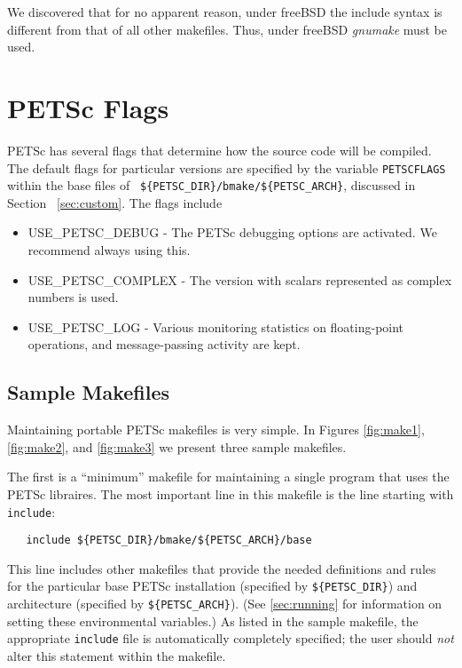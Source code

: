 We discovered that for no apparent reason, under freeBSD the include 
syntax is different from that of all other makefiles. Thus, under 
freeBSD {\em gnumake} must be used.

\section{PETSc Flags}
\label{sec:makeflags}

PETSc has several flags that determine how the source code will be
compiled.  The default flags for particular versions are specified by
the variable {\tt PETSCFLAGS} within the base files of {\tt
\$\{PETSC\_DIR\}/bmake/\$\{PETSC\_ARCH\}}, discussed in Section
~\ref{sec:custom}.  The flags include
\begin{itemize}
\item USE\_PETSC\_DEBUG - The PETSc debugging options are activated. We 
      recommend always using this. 
\item USE\_PETSC\_COMPLEX - The version with scalars represented 
      as complex numbers is used. 
\item USE\_PETSC\_LOG - Various monitoring statistics on floating-point operations,
      and message-passing activity are kept. 
\end{itemize}

\subsection{Sample Makefiles}

Maintaining portable PETSc makefiles is very simple. In Figures
\ref{fig:make1}, \ref{fig:make2}, and \ref{fig:make3} we present three
sample makefiles.  

The first is a ``minimum'' makefile for maintaining
a single program that uses the PETSc libraires.
The most important line in this makefile is the line starting with {\tt include}:
\begin{verbatim}
   include ${PETSC_DIR}/bmake/${PETSC_ARCH}/base
\end{verbatim}
This line includes other makefiles that provide the needed definitions
and rules for the particular base PETSc installation (specified by
{\tt \$\{PETSC\_DIR\}}) and architecture (specified by
{\tt \$\{PETSC\_ARCH\}}).  (See \ref{sec:running} for information on
setting these environmental variables.)  As listed in the sample
makefile, the appropriate {\tt include} file is automatically
completely specified; the user should {\em not} alter this statement
within the makefile.

